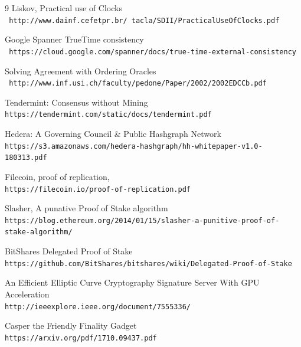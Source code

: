 \documentclass[12pt]{article}
\begin{document}
\begin{thebibliography}{9}
Liskov, Practical use of Clocks
\\\texttt{ http://www.dainf.cefetpr.br/~tacla/SDII/PracticalUseOfClocks.pdf}

Google Spanner TrueTime consistency
\\\texttt{ https://cloud.google.com/spanner/docs/true-time-external-consistency}

Solving Agreement with Ordering Oracles
\\\texttt{ http://www.inf.usi.ch/faculty/pedone/Paper/2002/2002EDCCb.pdf}

Tendermint: Consensus without Mining
\\\texttt{https://tendermint.com/static/docs/tendermint.pdf}

Hedera: A Governing Council \& Public Hashgraph Network
\\\texttt{https://s3.amazonaws.com/hedera-hashgraph/hh-whitepaper-v1.0-180313.pdf}

Filecoin, proof of replication,
\\\texttt{https://filecoin.io/proof-of-replication.pdf}

Slasher, A punative Proof of Stake algorithm
\\\texttt{https://blog.ethereum.org/2014/01/15/slasher-a-punitive-proof-of-stake-algorithm/}

BitShares Delegated Proof of Stake
\\\texttt{https://github.com/BitShares/bitshares/wiki/Delegated-Proof-of-Stake}

An Efficient Elliptic Curve Cryptography Signature Server With GPU Acceleration
\\\texttt{http://ieeexplore.ieee.org/document/7555336/}

Casper the Friendly Finality Gadget
\\\texttt{https://arxiv.org/pdf/1710.09437.pdf}
\end{thebibliography}
\end{document}
